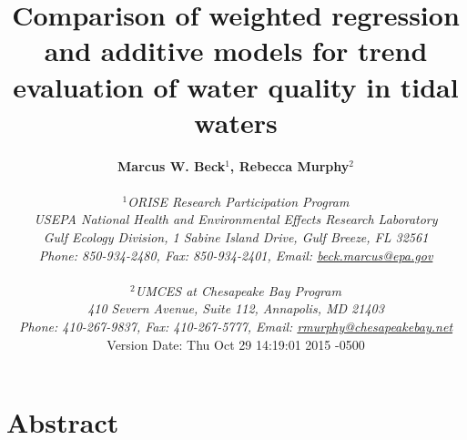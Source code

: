 \documentclass[letterpaper,12pt,oneside]{article}\usepackage[]{graphicx}\usepackage[]{color}
\begin{document}
\raggedbottom
\linenumbers
\raggedright
{}
\setlength{\parindent}{0.5in}
\renewcommand\refname{References \vspace{12pt}}

\begin{singlespace}
\title{{\bf {\Large Comparison of weighted regression and additive models for trend evaluation of water quality in tidal waters}}}
\author{
  {\bf {\normalsize Marcus W. Beck$^1$, Rebecca Murphy$^2$}}
  \\\\{\textit {\normalsize $^1$ORISE Research Participation Program}}
  \\{\textit {\normalsize USEPA National Health and Environmental Effects Research Laboratory}}
  \\{\textit {\normalsize Gulf Ecology Division, 1 Sabine Island Drive, Gulf Breeze, FL 32561}}
	\\{\textit {\normalsize Phone: 850-934-2480, Fax: 850-934-2401, Email: \href{mailto:beck.marcus@epa.gov}{beck.marcus@epa.gov}}}
  \\\\{\textit {\normalsize $^2$UMCES at Chesapeake Bay Program}}
	\\{\textit {\normalsize 410 Severn Avenue, Suite 112, Annapolis, MD 21403}}
	\\{\textit {\normalsize Phone: 410-267-9837, Fax: 410-267-5777, Email: \href{mailto:rmurphy@chesapeakbay.net}{rmurphy@chesapeakebay.net}}}
  \vspace{1in} 
  \\ Version Date:   Thu Oct 29 14:19:01 2015 -0500
	}
\date{}
\maketitle
\end{singlespace}
\clearpage

\section*{Abstract}
\end{document}
